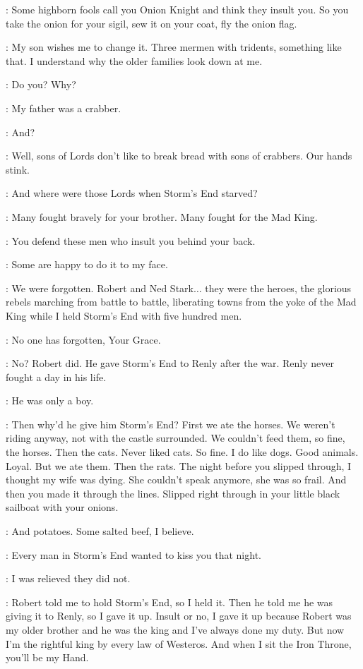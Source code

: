 \STANNIS: Some highborn fools call you Onion Knight and think they insult you. So you take the onion for your sigil, sew it on your coat, fly the onion flag. 

\DAVOS: My son wishes me to change it. Three mermen with tridents, something like that. I understand why the older families look down at me. 

\STANNIS: Do you? Why? 

\DAVOS: My father was a crabber. 

\STANNIS: And? 

\DAVOS: Well, sons of Lords don't like to break bread with sons of crabbers. Our hands stink. 

\STANNIS: And where were those Lords when Storm's End starved? 

\DAVOS: Many fought bravely for your brother. Many fought for the Mad King. 

\STANNIS: You defend these men who insult you behind your back. 

\DAVOS: Some are happy to do it to my face. 

\STANNIS: We were forgotten. Robert and Ned Stark$\ldots$ they were the heroes, the glorious rebels marching from battle to battle, liberating towns from the yoke of the Mad King while I held Storm's End with five hundred men. 

\DAVOS: No one has forgotten, Your Grace. 

\STANNIS: No? Robert did. He gave Storm's End to Renly after the war. Renly never fought a day in his life. 

\DAVOS: He was only a boy. 

\STANNIS: Then why'd he give him Storm's End? First we ate the horses. We weren't riding anyway, not with the castle surrounded. We couldn't feed them, so fine, the horses. Then the cats. Never liked cats. So fine. I do like dogs. Good animals. Loyal. But we ate them. Then the rats. The night before you slipped through, I thought my wife was dying. She couldn't speak anymore, she was so frail. And then you made it through the lines. Slipped right through in your little black sailboat with your onions. 

\DAVOS: And potatoes. Some salted beef, I believe. 

\STANNIS: Every man in Storm's End wanted to kiss you that night. 

\DAVOS: I was relieved they did not. 

\STANNIS: Robert told me to hold Storm's End, so I held it. Then he told me he was giving it to Renly, so I gave it up. Insult or no, I gave it up because Robert was my older brother and he was the king and I've always done my duty. But now I'm the rightful king by every law of Westeros. And when I sit the Iron Throne, you'll be my Hand. 

